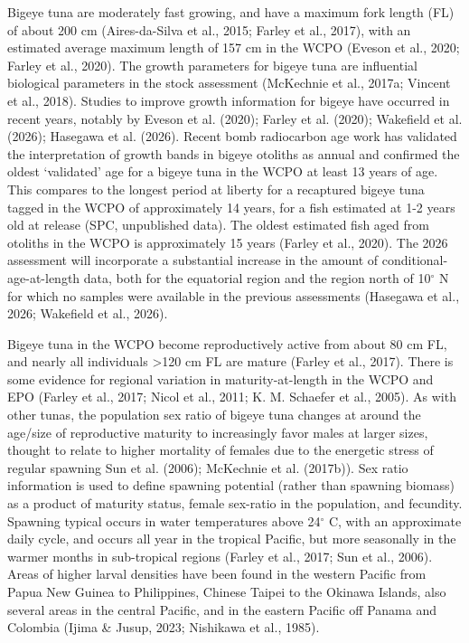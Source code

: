 \documentclass[
  english,
  a4paper,
  a4paper,
  11pt]{SCreport}
\begin{document}
Bigeye tuna are moderately fast growing, and have a maximum fork length
(FL) of about 200 cm (Aires-da-Silva et al., 2015; Farley et al., 2017),
with an estimated average maximum length of 157 cm in the WCPO (Eveson
et al., 2020; Farley et al., 2020). The growth parameters for bigeye
tuna are influential biological parameters in the stock assessment
(McKechnie et al., 2017a; Vincent et al., 2018). Studies to improve
growth information for bigeye have occurred in recent years, notably by
Eveson et al. (2020); Farley et al. (2020); Wakefield et al. (2026);
Hasegawa et al. (2026). Recent bomb radiocarbon age work has validated
the interpretation of growth bands in bigeye otoliths as annual and
confirmed the oldest `validated' age for a bigeye tuna in the WCPO at
least 13 years of age. This compares to the longest period at liberty
for a recaptured bigeye tuna tagged in the WCPO of approximately 14
years, for a fish estimated at 1-2 years old at release (SPC,
unpublished data). The oldest estimated fish aged from otoliths in the
WCPO is approximately 15 years (Farley et al., 2020). The 2026
assessment will incorporate a substantial increase in the amount of
conditional-age-at-length data, both for the equatorial region and the
region north of 10\(^\circ\) N for which no samples were available in
the previous assessments (Hasegawa et al., 2026; Wakefield et al.,
2026).

Bigeye tuna in the WCPO become reproductively active from about 80 cm
FL, and nearly all individuals \textgreater120 cm FL are mature (Farley
et al., 2017). There is some evidence for regional variation in
maturity-at-length in the WCPO and EPO (Farley et al., 2017; Nicol et
al., 2011; K. M. Schaefer et al., 2005). As with other tunas, the
population sex ratio of bigeye tuna changes at around the age/size of
reproductive maturity to increasingly favor males at larger sizes,
thought to relate to higher mortality of females due to the energetic
stress of regular spawning Sun et al. (2006); McKechnie et al. (2017b)).
Sex ratio information is used to define spawning potential (rather than
spawning biomass) as a product of maturity status, female sex-ratio in
the population, and fecundity. Spawning typical occurs in water
temperatures above 24\(^\circ\) C, with an approximate daily cycle, and
occurs all year in the tropical Pacific, but more seasonally in the
warmer months in sub-tropical regions (Farley et al., 2017; Sun et al.,
2006). Areas of higher larval densities have been found in the western
Pacific from Papua New Guinea to Philippines, Chinese Taipei to the
Okinawa Islands, also several areas in the central Pacific, and in the
eastern Pacific off Panama and Colombia (Ijima \& Jusup, 2023; Nishikawa
et al., 1985).
\end{document}
